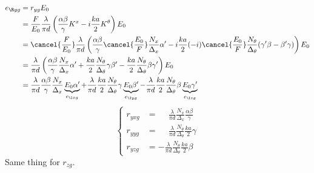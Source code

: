 \begin{align*}
    e_{\R yg}
    &= r_{yg} E_0
    \\
    &= \frac{F}{E_0}
       \frac{\lambda}{\pi d}
       \left(
           \frac{\alpha \beta}{\gamma}
           K^x
           -
           i
           \frac{ka}{2}
           K^\theta           
       \right)
       E_0
    \\
    &= \cancel{\frac{F}{E_0}}
       \frac{\lambda}{\pi d}
       \left(
           \frac{\alpha \beta}{\gamma}
           \cancel{\frac{E_0}{F}}
           \frac{N_x}{\Delta_x}
           \alpha'
           -
           i
           \frac{ka}{2}
           (-i)
           \cancel{\frac{E_0}{F}}
           \frac{N_\theta}{\Delta_\theta}
           (\gamma' \beta - \beta' \gamma)           
       \right)
       E_0
    \\
    &= \frac{\lambda}{\pi d}
       \left(
           \frac{\alpha \beta}{\gamma}
           \frac{N_x}{\Delta_x}
           \alpha'
           +
           \frac{ka}{2}
           \frac{N_\theta}{\Delta_\theta}
           \gamma
           \beta'
           -
           \frac{ka}{2}
           \frac{N_\theta}{\Delta_\theta}
           \beta
           \gamma'
       \right)
       E_0
    \\
    &= \frac{\lambda}{\pi d}
       \frac{\alpha \beta}{\gamma}
       \frac{N_x}{\Delta_x}
       \underbrace{E_0 \alpha'}_{e_{\I xg}}
       +
       \frac{\lambda}{\pi d}
       \frac{ka}{2}
       \frac{N_\theta}{\Delta_\theta}
       \gamma
       \underbrace{E_0 \beta'}_{e_{\I yg}}
       -
       \frac{\lambda}{\pi d}
       \frac{ka}{2}
       \frac{N_\theta}{\Delta_\theta}
       \beta
       \underbrace{E_0 \gamma'}_{e_{\I zg}}
\end{align*}
\begin{equation}
    \left\lbrace
    \begin{aligned}
        r_{yxg}
        &=
        \phantom{-}
        \frac{\lambda}{\pi d}
        \frac{N_x}{\Delta_x}
        \frac{\alpha \beta}{\gamma}
        \\
        r_{yyg}
        &=
        \phantom{-}
        \frac{\lambda}{\pi d}
        \frac{N_\theta}{\Delta_\theta}
        \frac{ka}{2}
        \gamma
        \\
        r_{yzg}
        &=
        -
        \frac{\lambda}{\pi d}
        \frac{N_\theta}{\Delta_\theta}
        \frac{ka}{2}
        \beta
    \end{aligned}
    \right.
\end{equation}
Same thing for $r_{zg}$.
